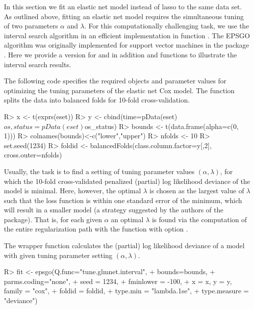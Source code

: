\documentclass[]{jss}
\begin{document}
In this section we fit an elastic net model instead of lasso to the same data set. As outlined above, fitting an elastic net model requires the simultaneous tuning of two parameters $\alpha$ and $\lambda$. For this computationally challenging task, we use the interval search algorithm in an efficient implementation in  function . The EPSGO algorithm was originally implemented for support vector machines in the  package  \citep{becker2009,penSVM}. Here we provide a version for  and in addition  and  functions to illustrate the interval search results.

The following code specifies the required objects and parameter values for optimizing the tuning parameters of the elastic net Cox model. The  function splits the data into balanced folds for 10-fold cross-validation.
\begin{Schunk}
\begin{Sinput}
R>   x <- t(exprs(eset))
R>   y <- cbind(time=pData(eset)$os,status=pData(eset)$os_status)
R>   bounds <- t(data.frame(alpha=c(0, 1)))
R>   colnames(bounds)<-c("lower","upper")
R>   nfolds <- 10
R>   set.seed(1234)
R>   foldid <- balancedFolds(class.column.factor=y[,2], cross.outer=nfolds)
\end{Sinput}
\end{Schunk}

Usually, the task is to find a setting of tuning parameter values $\left(\alpha,\lambda\right)$, for which the 10-fold cross-validated penalized (partial) log likelihood deviance of the model is minimal. Here, however, the optimal $\lambda$ is chosen as the largest value of $\lambda$ such that the loss function is within one standard error of the minimum, which will result in a smaller model (a strategy suggested by the authors of the  package). That is, for each given $\alpha$ an optimal $\lambda$ is found via the computation of the entire regularization path with the  function with option .

The wrapper function  calculates the (partial) log likelihood deviance of a model with given tuning parameter setting $\left(\alpha,\lambda\right)$.

\begin{Schunk}
\begin{Sinput}
R>   fit <- epsgo(Q.func="tune.glmnet.interval", 
+               bounds=bounds, 
+               parms.coding="none", 
+               seed = 1234, 
+               fminlower = -100,
+               x = x, y = y, family = "cox", 
+               foldid = foldid,
+               type.min = "lambda.1se",
+               type.measure = "deviance")
\end{Sinput}
\end{Schunk}
\end{document}
